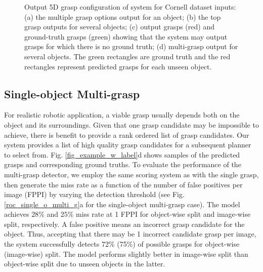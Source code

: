 \documentclass[letterpaper, 10 pt, journal, twoside]{IEEEtran}
\begin{document}
\begin{figure*}[t]
  \centering
  \vspace*{0.07in}
  \caption{Output 5D grasp configuration of system for Cornell dataset inputs: 
    (a) the multiple grasp options output for an object; 
    (b) the top grasp outputs for several objects; 
    (c) output grasps (red) and ground-truth grasps
    (green) showing that the system may output grasps for which
    there is no ground truth;
(d) multi-grasp output for several objects. The green rectangles are
    ground truth and the red rectangles represent predicted grasps for 
    each unseen object.
\label{fig_newArea} \label{fig_example_w_label} \label{singleGrasp}}
  \vspace*{-0.125in}
\end{figure*}

\subsection{Single-object Multi-grasp}
For realistic robotic application, a viable grasp usually depends both
on the object and its surroundings.  Given that one grasp candidate may
be impossible to achieve, there is benefit to provide a rank ordered
list of grasp candidates.  Our system provides a list of high quality
grasp candidates for a subsequent planner to select from. 
Fig. \ref{fig_example_w_label}d shows samples of the predicted grasps and
corresponding ground truths.  To evaluate the performance of the
multi-grasp detector, we employ the same scoring system as with the
single grasp, then generate the miss rate as a function of the number of false
positives per image (FPPI) by varying the detection threshold (see 
Fig. \ref{roc_single_o_multi_g}a for the single-object multi-grasp case).
The model achieves $28\%$ and $25\%$ miss rate at 1 FPPI for object-wise
split and image-wise split, respectively. 
A false positive means an incorrect grasp candidate for the object.
Thus, accepting that there may be 1 incorrect candidate grasp per image,
the system successfully detects 72\% (75\%) of possible grasps for
object-wise (image-wise) split.  The model performs slightly better in
image-wise split than object-wise split due to unseen objects in the
latter. 
\end{document}
